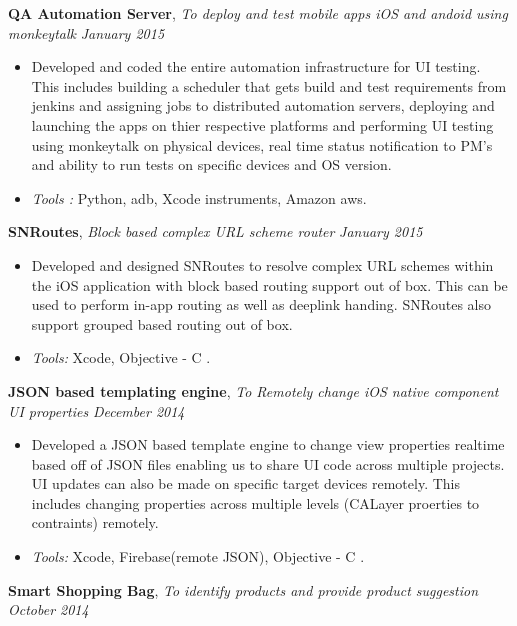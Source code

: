 \documentclass[9pt]{article}
\newenvironment{changemargin}[2]{%
  \begin{list}{}{%
    \setlength{\topsep}{0pt}%
    \setlength{\leftmargin}{#1}%
    \setlength{\rightmargin}{#2}%
    \setlength{\listparindent}{\parindent}%
    \setlength{\itemindent}{\parindent}%
    \setlength{\parsep}{\parskip}%
  }%
  \item[]}{\end{list}
}
\newenvironment{body} {
	\vspace*{-16pt}
	\begin{changemargin}{-0.25in}{-0.5in}
  }	
	{\end{changemargin}
}
\begin{document}
\begin{body}
\textbf {QA Automation Server}, \emph{ To deploy and test mobile apps iOS and andoid using monkeytalk} \hfill \emph{January 2015}\\
	\vspace*{-4pt}
	\begin{itemize} \itemsep -0pt
	\item Developed and coded the entire automation infrastructure for UI testing. This includes building a scheduler that gets build and test requirements from 	  jenkins and assigning jobs to distributed automation servers, deploying and launching the apps on thier respective platforms and performing UI testing using monkeytalk on physical devices, real time status notification to PM's and ability to run tests on specific devices and OS version.
		\item \emph{Tools :} Python, adb, Xcode instruments, Amazon aws.
\end{itemize}
\textbf {SNRoutes}, \emph{ Block based complex URL scheme router } \hfill \emph{January 2015}\\
	\vspace*{-4pt}
	\begin{itemize} \itemsep -0pt
	\item Developed and designed SNRoutes to resolve complex URL schemes within the iOS application with block based routing support out of box. This can be used to perform in-app routing as well as deeplink handing. SNRoutes also support grouped based routing out of box.
	\item \emph{Tools:} Xcode, Objective - C .
\end{itemize}
\textbf {JSON based templating engine}, \emph{ To Remotely change iOS native component UI properties } \hfill \emph{December 2014}\\
	\vspace*{-4pt}
	\begin{itemize} \itemsep -0pt
	\item Developed a JSON based template engine to change view properties realtime based off of JSON files enabling us to share UI code across multiple projects. UI updates can also be made on specific target devices remotely. This includes changing properties across multiple levels (CALayer proerties to contraints) remotely.
	\item \emph{Tools:} Xcode, Firebase(remote JSON), Objective - C .
\end{itemize}
\textbf {Smart Shopping Bag}, \emph{ To identify products and provide product suggestion} \hfill \emph{October 2014}\\

\end{body}
\end{document}
